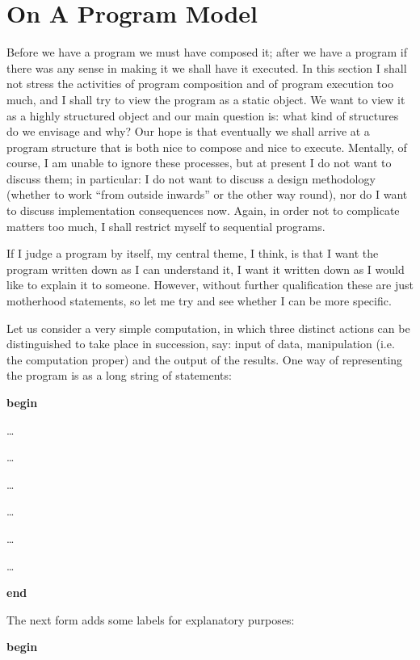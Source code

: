 \section[On a program model]{On A Program Model}
\label{eq:program-model}

Before we have a program we must have composed it; after we have a program \textemdash{}  if there was any sense in making it \textemdash{}  we shall have it executed. In this section I shall not stress the activities of program composition and of program execution too much, and I shall try to view the program as a static object. We want to view it as a highly structured object and our main question is: what kind of structures do we envisage and why? Our hope is that eventually we shall arrive at a program structure that is both nice to compose and nice to execute. Mentally, of course, I am unable to ignore these processes, but at present I do not want to discuss them; in particular: I do not want to discuss a design methodology (whether to work ``from outside inwards'' or the other way round), nor do I want to discuss implementation consequences now. Again, in order not to complicate matters too much, I shall restrict myself to sequential programs.

If I judge a program by itself, my central theme, I think, is that I want the program written down as I can understand it, I want it written down as I would like to explain it to someone. However, without further qualification these are just motherhood statements, so let me try and see whether I can be more specific.

Let us consider a very simple computation, in which three distinct actions can be distinguished to take place in succession, say: input of data, manipulation (i.e. the computation proper) and the output of the results. One way of representing the program is as a long string of statements:

\noindent
\textbf{begin}

\noindent
\quad\dots

\noindent
\quad\dots

\noindent
\quad\dots

\noindent
\quad\dots

\noindent
\quad\dots

\noindent
\quad\dots

\noindent
\textbf{end}

The next form adds some labels for explanatory purposes:

\noindent
\tabto{10em}\textbf{begin}
\nopagebreak

